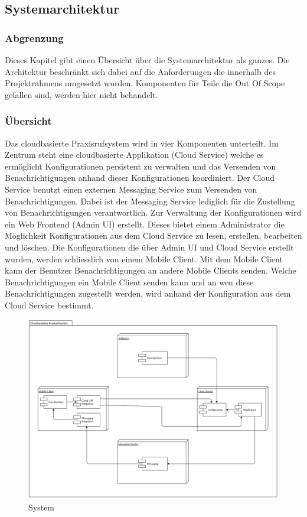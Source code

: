 \subsection{Systemarchitektur}\label{subsec:systemarchitektur}
\subsubsection*{Abgrenzung}

Dieses Kapitel gibt einen Übersicht über die Systemarchitektur als ganzes. Die Architektur beschränkt sich dabei auf die
Anforderungen die innerhalb des Projektrahmens umgesetzt wurden. Komponenten für Teile die Out Of Scope gefallen sind,
werden hier nicht behandelt.

\subsubsection*{Übersicht}

Das cloudbasierte Praxisrufsystem wird in vier Komponenten unterteilt.
Im Zentrum steht eine cloudbasierte Applikation (Cloud Service) welche es ermöglicht Konfigurationen persistent zu verwalten und das Versenden von Benachrichtigungen anhand dieser Konfigurationen koordiniert.
Der Cloud Service benutzt einen externen Messaging Service zum Versenden von Benachrichtigungen. Dabei ist der Messaging Service lediglich für die Zustellung von Benachrichtigungen verantwortlich.
Zur Verwaltung der Konfigurationen wird ein Web Frontend (Admin UI) erstellt. Dieses bietet einem Administrator die Möglichkeit Konfigurationen aus dem Cloud Service zu lesen, erstellen, bearbeiten und löschen.
Die Konfigurationen die über Admin UI und Cloud Service erstellt wurden, werden schliesslich von einem Mobile Client. Mit dem Mobile Client kann der Benutzer Benachrichtigungen an andere Mobile Clients senden.
Welche Benachrichtigungen ein Mobile Client senden kann und an wen diese Benachrichtigungen zugestellt werden, wird anhand der Konfiguration aus dem Cloud Service bestimmt.

\begin{figure}[h]
    \centering
    \begin{minipage}[b]{1.0\textwidth}
        \includegraphics[width=\textwidth]{graphics/Component_System}
        \caption{System}
    \end{minipage}
\end{figure}

\clearpage
